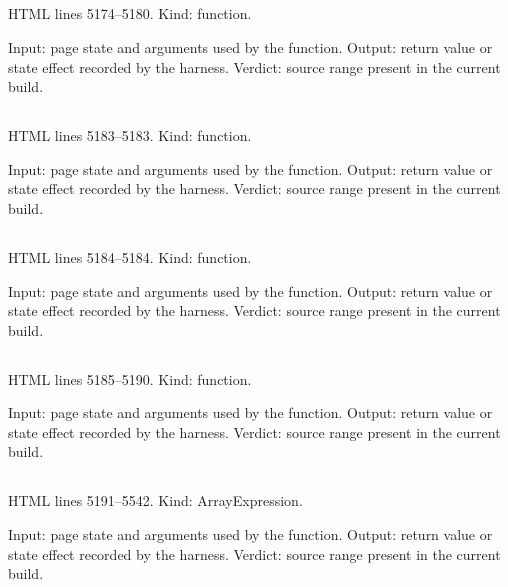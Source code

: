 \subsection*{\texttt{}}
\label{vf_237_gCutLines}
HTML lines 5174--5180. Kind: function.

Input: page state and arguments used by the function.
Output: return value or state effect recorded by the harness.
Verdict: source range present in the current build.

\subsection*{\texttt{}}
\label{vf_238_gRunDate}
HTML lines 5183--5183. Kind: function.

Input: page state and arguments used by the function.
Output: return value or state effect recorded by the harness.
Verdict: source range present in the current build.

\subsection*{\texttt{}}
\label{vf_239_gByDate}
HTML lines 5184--5184. Kind: function.

Input: page state and arguments used by the function.
Output: return value or state effect recorded by the harness.
Verdict: source range present in the current build.

\subsection*{\texttt{}}
\label{vf_240_gRunTicks}
HTML lines 5185--5190. Kind: function.

Input: page state and arguments used by the function.
Output: return value or state effect recorded by the harness.
Verdict: source range present in the current build.

\subsection*{\texttt{}}
\label{vf_241_GRAPHS}
HTML lines 5191--5542. Kind: ArrayExpression.

Input: page state and arguments used by the function.
Output: return value or state effect recorded by the harness.
Verdict: source range present in the current build.


